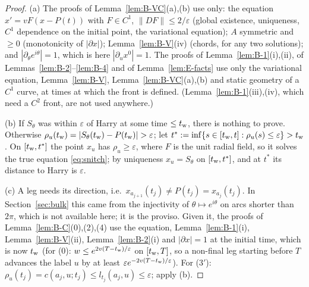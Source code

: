 \begin{proof}
(a) The proofs of Lemma~\ref{lem:B-VC}(a),(b) use only: the equation $x'=vF(x-P(t))$ with $F\in C^1$, $\|DF\|\le2/\varepsilon$
(global existence, uniqueness, $C^1$ dependence on the initial point, the variational equation); $A$ symmetric and $\ge0$
(monotonicity of $|\partial x|$); Lemma~\ref{lem:B-V}(iv) (chords, for any two solutions); and $|\partial_\theta e^{i\theta}|=1$,
which is here $|\partial_ux^0|=1$. The proofs of Lemma~\ref{lem:B-1}(i),(ii), of Lemmas~\ref{lem:B-2}--\ref{lem:B-4} and of
Lemma~\ref{lem:E-facts} use only the variational equation, Lemma~\ref{lem:B-V}, Lemma~\ref{lem:B-VC}(a),(b) and static geometry
of a $C^1$ curve, at times at which the front is defined. (Lemma~\ref{lem:B-1}(iii),(iv), which need a $C^2$ front, are not used
anywhere.)

(b) If $S_\theta$ was within $\varepsilon$ of Harry at some time $\le t_{\mathrm w}$, there is nothing to prove. Otherwise
$\rho_u(\Mtw)=|S_\theta(\Mtw)-P(\Mtw)|>\varepsilon$; let $t^*:=\inf\{s\in[t_{\mathrm w},t]:\rho_u(s)\le\varepsilon\}>t_{\mathrm w}$. On $[t_{\mathrm w},t^*]$
the point $x_u$ has $\rho_u\ge\varepsilon$, where $F$ is the unit radial field, so it solves the true equation
\eqref{eq:snitch}; by uniqueness $x_u=S_\theta$ on $[t_{\mathrm w},t^*]$, and at $t^*$ its distance to Harry is $\varepsilon$.

(c) A leg needs its direction, i.e.\ $x_{a_{j+1}}(t_j)\ne P(t_j)=x_{a_j}(t_j)$. In Section~\ref{sec:bulk} this came from the
injectivity of $\theta\mapsto e^{i\theta}$ on arcs shorter than $2\pi$, which is not available here; it is the proviso. Given it, the
proofs of Lemma~\ref{lem:B-C}(0),(2),(4) use the equation, Lemma~\ref{lem:B-1}(i), Lemma~\ref{lem:B-V}(ii),
Lemma~\ref{lem:B-2}(i) and $|\partial x|=1$ at the initial time, which is now $t_{\mathrm w}$ (for (0): $w\le e^{2v(T-t_{\mathrm w})/\varepsilon}$ on
$[t_{\mathrm w},T]$, so a non-final leg starting before $T$ advances the label $u$ by at least $\varepsilon e^{-2v(T-t_{\mathrm w})/\varepsilon}$).
For \textup{($3'$)}: $\rho_u(t_j)=c(a_j,u;t_j)\le l_{t_j}(a_j,u)\le\varepsilon$; apply (b).


\end{proof}
